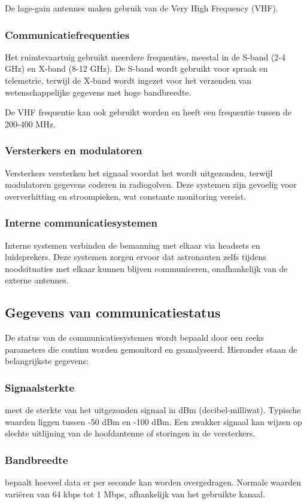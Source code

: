 De lage-gain antennes maken gebruik van de Very High Frequency (VHF).

\subsubsection{Communicatiefrequenties}
Het ruimtevaartuig gebruikt meerdere frequenties, meestal in de S-band (2-4 GHz) en X-band (8-12 GHz). De S-band wordt gebruikt voor spraak en telemetrie, terwijl de X-band wordt ingezet voor het verzenden van wetenschappelijke gegevens met hoge bandbreedte.

De VHF frequentie kan ook gebruikt worden en heeft een frequentie tussen de 200-400 MHz.

\subsubsection{Versterkers en modulatoren}
Versterkers versterken het signaal voordat het wordt uitgezonden, terwijl modulatoren gegevens coderen in radiogolven. Deze systemen zijn gevoelig voor oververhitting en stroompieken, wat constante monitoring vereist.

\subsubsection{Interne communicatiesystemen}
Interne systemen verbinden de bemanning met elkaar via headsets en luidsprekers. Deze systemen zorgen ervoor dat astronauten zelfs tijdens noodsituaties met elkaar kunnen blijven communiceren, onafhankelijk van de externe antennes.


\subsection{Gegevens van communicatiestatus}
De status van de communicatiesystemen wordt bepaald door een reeks parameters die continu worden gemonitord en geanalyseerd. Hieronder staan de belangrijkste gegevens:

\subsubsection{Signaalsterkte} 
meet de sterkte van het uitgezonden signaal in dBm (decibel-milliwat). Typische waarden liggen tussen -50 dBm en -100 dBm. Een zwakker signaal kan wijzen op slechte uitlijning van de hoofdantenne of storingen in de versterkers.

\subsubsection{Bandbreedte}
bepaalt hoeveel data er per seconde kan worden overgedragen. Normale waarden variëren van 64 kbps tot 1 Mbps, afhankelijk van het gebruikte kanaal.

